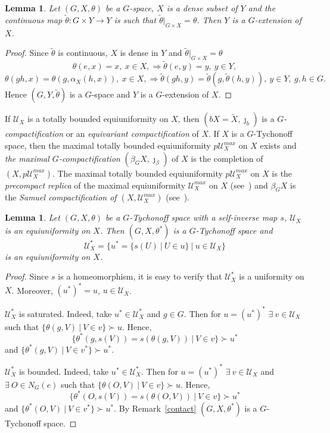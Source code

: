 \documentclass{amsart}
\newtheorem{lem}[thm]{Lemma}
\begin{document}
\begin{lem}\label{exact}
Let $(G, X, \theta)$ be a $G$-space, $X$ is a dense subset of $Y$ and the continuous map $\tilde\theta: G\times Y\to Y$ is such that $\tilde\theta|_{G\times X}=\theta$. Then $Y$ is a $G$-extension of $X$.
\end{lem}

\begin{proof} Since $\tilde\theta$ is continuous,  $X$ is dense in $Y$  and $\tilde\theta|_{G\times X}=\theta$
$$\theta (e, x)=x,\ x\in X, \Longrightarrow \tilde\theta (e, y)=y,\ y\in Y,$$
$$\theta (gh, x)=\theta (g, \alpha_X (h, x)),\ x\in X, \Longrightarrow \tilde\theta (gh, y)=\tilde\theta (g, \tilde\theta (h, y)),\ y\in Y,\ g, h\in G.$$
Hence $(G, Y, \tilde\theta)$ is a $G$-space and $Y$ is a $G$-extension of $X$. 
\end{proof}

If $\mathcal U_X$ is  a totally bounded equiuniformity on $X$, then $(b X=\tilde X, \jmath_b)$ is a  {\it $G$-compactification}  or an {\it equivariant compactification} of  $X$. If $X$ is a $G$-Tychonoff space,  then the maximal totally bounded equiuniformity $p\mathcal U^{max}_X$ on $X$ exists and {\it the maximal $G$-compactification}  $(\beta_G X, \jmath_{\beta})$ of $X$ is the completion of $(X, p\mathcal U^{max}_X)$. The maximal totally bounded equiuniformity  $p\mathcal U_X^{max}$ on $X$ is the {\it precompact replica} of the maximal equiuniformity $\mathcal U_X^{max}$ on $X$ (see~\cite[Ch.~2]{Isbell}) and $\beta_G X$  is the {\it Samuel compactification of $(X, \mathcal U_X^{max})$} (see~\cite[Ch.\ 8, Problem 8.5.7]{Engelking}). 

\begin{lem}\label{invunif}
Let $(G, X, \theta)$ be a $G$-Tychonoff space with a self-inverse map $s$, $\mathcal U_X$ is an equiuniformity on $X$. Then 
$(G, X, \theta^*)$ is a $G$-Tychonoff space and 
$$\mathcal U^*_X=\{u^*=\{s(U)\ |\ U\in u\}\ |\ u\in\mathcal U_X\}$$
is an equiuniformity on $X$.
\end{lem}

\begin{proof} Since $s$ is a homeomorphism, it is easy to verify that $\mathcal U^*_X$ is a uniformity on $X$. Moreover, $(u^*)^*=u$, $ u\in\mathcal U_X$. 

$\mathcal U^*_X$ is saturated. Indeed, take $u^*\in\mathcal U^*_X$ and $g\in G$. Then for $u=(u^*)^*$ $\exists\ v\in\mathcal U_X$ such that 
$\{\theta (g, V)\ |\ V\in v\}\succ u$. Hence, 
$$\{\theta^* (g, s(V))=s(\theta (g, V))\ |\ V\in v\}\succ u^*$$
and $\{\theta^* (g, V)\ |\ V\in v^*\}\succ u^*$.

$\mathcal U^*_X$ is bounded. Indeed, take $u^*\in\mathcal U^*_X$. Then for $u=(u^*)^*$ $\exists\ v\in\mathcal U_X$ and $\exists\ O\in N_G(e)$ such that 
$\{\theta (O, V)\ |\ V\in v\}\succ u$. Hence, 
$$\{\theta^* (O, s(V))=s(\theta (O, V))\ |\ V\in v\}\succ u^*$$
and $\{\theta^* (O, V)\ |\ V\in v^*\}\succ u^*$. By Remark~\ref{contact} $(G, X, \theta^*)$ is a $G$-Tychonoff space.
\end{proof}
\end{document}
